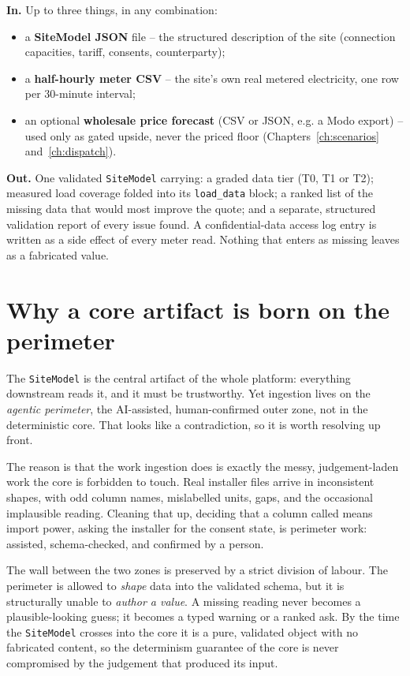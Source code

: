 \begin{contract}
\textbf{In.} Up to three things, in any combination:
\begin{itemize}
  \item a \textbf{SiteModel JSON} file -- the structured description of the site (connection capacities, tariff, consents, counterparty);
  \item a \textbf{half-hourly meter CSV} -- the site's own real metered electricity, one row per 30-minute interval;
  \item an optional \textbf{wholesale price forecast} (CSV or JSON, e.g. a Modo export) -- used only as gated upside, never the priced floor (Chapters~\ref{ch:scenarios} and~\ref{ch:dispatch}).
\end{itemize}
\textbf{Out.} One validated \texttt{SiteModel} carrying: a graded data tier (T0, T1 or T2); measured load coverage folded into its \texttt{load\_data} block; a ranked list of the missing data that would most improve the quote; and a separate, structured validation report of every issue found. A confidential-data access log entry is written as a side effect of every meter read. Nothing that enters as missing leaves as a fabricated value.
\end{contract}

\section{Why a core artifact is born on the perimeter}

The \texttt{SiteModel} is the central artifact of the whole platform: everything downstream reads it, and it must be trustworthy. Yet ingestion lives on the \emph{agentic perimeter}, the AI-assisted, human-confirmed outer zone, not in the deterministic core. That looks like a contradiction, so it is worth resolving up front.

The reason is that the work ingestion does is exactly the messy, judgement-laden work the core is forbidden to touch. Real installer files arrive in inconsistent shapes, with odd column names, mislabelled units, gaps, and the occasional implausible reading. Cleaning that up, deciding that a column called  means import power, asking the installer for the consent state, is perimeter work: assisted, schema-checked, and confirmed by a person.

The wall between the two zones is preserved by a strict division of labour. The perimeter is allowed to \emph{shape} data into the validated schema, but it is structurally unable to \emph{author a value}. A missing reading never becomes a plausible-looking guess; it becomes a typed warning or a ranked ask. By the time the \texttt{SiteModel} crosses into the core it is a pure, validated object with no fabricated content, so the determinism guarantee of the core is never compromised by the judgement that produced its input.

